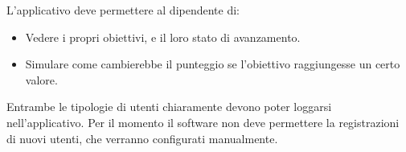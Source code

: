 L'applicativo deve permettere al dipendente di:
\begin{itemize}
    \item Vedere i propri obiettivi, e il loro stato di avanzamento.
    \item Simulare come cambierebbe il punteggio se l'obiettivo raggiungesse un certo valore.
\end{itemize}

Entrambe le tipologie di utenti chiaramente devono poter loggarsi nell'applicativo.
Per il momento il software non deve permettere la registrazioni di nuovi utenti, che verranno configurati manualmente.

\newpage

